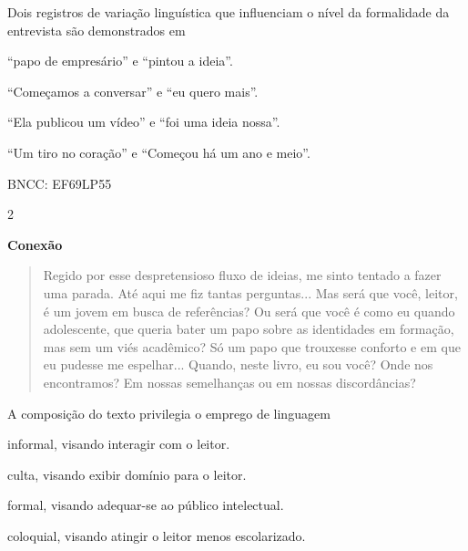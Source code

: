 Dois registros de variação linguística que influenciam o nível da
formalidade da entrevista são demonstrados em

\begin{escolha}
\item ``papo de empresário'' e ``pintou a ideia''.

\item ``Começamos a conversar'' e ``eu quero mais''.

\item ``Ela publicou um vídeo'' e ``foi uma ideia nossa''.

\item ``Um tiro no coração'' e ``Começou há um ano e meio''.
\end{escolha}


BNCC: EF69LP55

\num{2}

\textbf{Conexão}

\begin{quote}
Regido por esse despretensioso fluxo de ideias, me sinto tentado a fazer
uma parada. Até aqui me fiz tantas perguntas... Mas será que você,
leitor, é um jovem em busca de referências? Ou será que você é como eu
quando adolescente, que queria bater um papo sobre as identidades em
formação, mas sem um viés acadêmico? Só um papo que trouxesse conforto e
em que eu pudesse me espelhar... Quando, neste livro, eu sou você? Onde
nos encontramos? Em nossas semelhanças ou em nossas discordâncias?
\end{quote}

A composição do texto privilegia o emprego de linguagem

\begin{escolha}
\item informal, visando interagir com o leitor.

\item culta, visando exibir domínio para o leitor.

\item formal, visando adequar-se ao público intelectual.

\item coloquial, visando atingir o leitor menos escolarizado.
\end{escolha}



